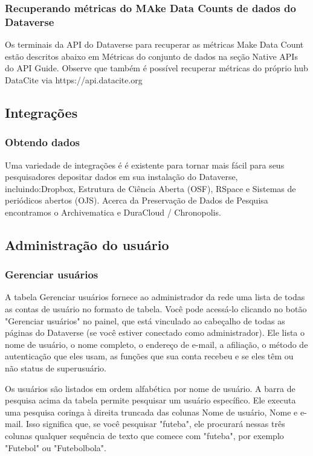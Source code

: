 \documentclass[12pt,hidelinks]{article}
\begin{document}
\subsubsection{Recuperando métricas do MAke Data Counts de dados do Dataverse}

\qquad Os terminais da API do Dataverse para recuperar as métricas Make Data Count estão descritos abaixo em Métricas do conjunto de dados na seção Native APIs do API Guide.
Observe que também é possível recuperar métricas do próprio hub DataCite via https://api.datacite.org


\subsection{Integrações}

\subsubsection{Obtendo dados}

\qquad Uma variedade de integrações é é existente para tornar mais fácil para seus pesquisadores depositar dados em sua instalação do Dataverse, incluindo:Dropbox, Estrutura de Ciência Aberta (OSF), RSpace e Sistemas de periódicos abertos (OJS). Acerca da Preservação de Dados de Pesquisa encontramos o Archivematica e
DuraCloud / Chronopolis.

\subsection{Administração do usuário}

\subsubsection{Gerenciar usuários}

\qquad A tabela Gerenciar usuários fornece ao administrador da rede uma lista de todas as contas de usuário no formato de tabela. Você pode acessá-lo clicando no botão "Gerenciar usuários" no painel, que está vinculado ao cabeçalho de todas as páginas do Dataverse (se você estiver conectado como administrador). Ele lista o nome de usuário, o nome completo, o endereço de e-mail, a afiliação, o método de autenticação que eles usam, as funções que sua conta recebeu e se eles têm ou não status de superusuário.

Os usuários são listados em ordem alfabética por nome de usuário. A barra de pesquisa acima da tabela permite pesquisar um usuário específico. Ele executa uma pesquisa coringa à direita truncada das colunas Nome de usuário, Nome e e-mail. Isso significa que, se você pesquisar "futeba", ele procurará nessas três colunas qualquer sequência de texto que comece com "futeba", por exemplo "Futebol" ou "Futebolbola".
\end{document}
